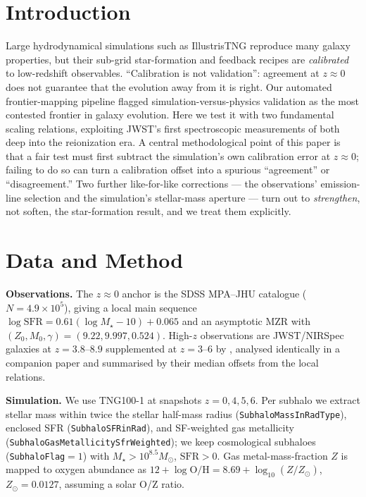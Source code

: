 \documentclass[twocolumn]{aastex631}
\begin{document}
\begin{abstract}
failure'' that is mostly an abundance-scale artifact. This is an automated, non-human-validated confrontation: we report a \emph{descriptive} discrepancy and a conservative lower bound, not a validated measurement, and it is fully reproducible from public data.
\end{abstract}


\section{Introduction}
Large hydrodynamical simulations such as IllustrisTNG \citep{pillepich18,nelson19} reproduce many galaxy properties, but their sub-grid star-formation and feedback recipes are \emph{calibrated} to low-redshift observables. ``Calibration is not validation'': agreement at $z\approx0$ does not guarantee that the evolution away from it is right. Our automated frontier-mapping pipeline flagged simulation-versus-physics validation as the most contested frontier in galaxy evolution. Here we test it with two fundamental scaling relations, exploiting JWST's first spectroscopic measurements of both deep into the reionization era. A central methodological point of this paper is that a fair test must first subtract the simulation's own calibration error at $z\approx0$; failing to do so can turn a calibration offset into a spurious ``agreement'' or ``disagreement.'' Two further like-for-like corrections --- the observations' emission-line selection and the simulation's stellar-mass aperture --- turn out to \emph{strengthen}, not soften, the star-formation result, and we treat them explicitly.

\section{Data and Method}
\textbf{Observations.} The $z\approx0$ anchor is the SDSS MPA--JHU catalogue \citep{brinchmann04,tremonti04} ($N=4.9\times10^{5}$), giving a local main sequence $\log\mathrm{SFR}=0.61(\log M_\star-10)+0.065$ and an asymptotic MZR with $(Z_0,M_0,\gamma)=(9.22,9.997,0.524)$. High-$z$ observations are JWST/NIRSpec galaxies at $z=3.8$--$8.9$ \citep{nakajima23} supplemented at $z=3$--$6$ by \citet{lisiecki25}, analysed identically in a companion paper and summarised by their median offsets from the local relations.

\textbf{Simulation.} We use TNG100-1 \citep{nelson19} at snapshots $z=0,4,5,6$. Per subhalo we extract stellar mass within twice the stellar half-mass radius (\texttt{SubhaloMassInRadType}), enclosed SFR (\texttt{SubhaloSFRinRad}), and SF-weighted gas metallicity (\texttt{SubhaloGasMetallicitySfrWeighted}); we keep cosmological subhaloes (\texttt{SubhaloFlag}$=1$) with $M_\star>10^{8.5}M_\odot$, $\mathrm{SFR}>0$. Gas metal-mass-fraction $Z$ is mapped to oxygen abundance as $12+\log\mathrm{O/H}=8.69+\log_{10}(Z/Z_\odot)$, $Z_\odot=0.0127$, assuming a solar O/Z ratio.
\end{document}
